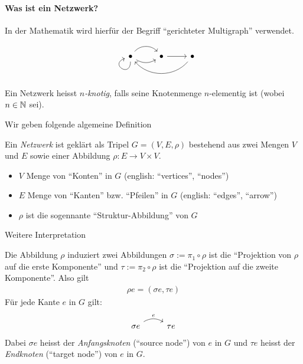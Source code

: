 \paragraph{Was ist ein Netzwerk?}
\begin{remark}
    In der Mathematik wird hierfür der Begriff ``gerichteter Multigraph'' verwendet.
\end{remark}
\begin{example}
    $$
    \begin{tikzcd}
        \bullet \arrow[loop, distance=2em, in=200, out=270] \arrow[r, bend left=49] \arrow[r, bend right] & \bullet \arrow[r] & \bullet \arrow[ll, bend left=49]
    \end{tikzcd}
    $$
\end{example}
\begin{remark}
    Ein Netzwerk heisst \emph{$n$-knotig}, falls seine Knotenmenge $n$-elementig ist (wobei $n \in \mathbb{N}$ sei).
\end{remark}
Wir geben folgende algemeine Definition
\begin{definition}
    Ein \emph{Netzwerk} ist geklärt als Tripel $G = (V,E,\rho)$ bestehend aus zwei Mengen $V$ und $E$ sowie einer Abbildung $\rho\colon E \to V\times V$.
\end{definition}
\begin{interpret}
    \begin{itemize}
        \item $V$ Menge von ``Konten'' in $G$ (english: ``vertices'', ``nodes'')
        \item $E$ Menge von ``Kanten'' bzw. ``Pfeilen'' in $G$ (english: ``edges'', ``arrow'')
        \item $\rho$ ist die sogennante ``Struktur-Abbildung'' von $G$
    \end{itemize}
\end{interpret}
Weitere Interpretation
\begin{interpret}
    Die Abbildung $\rho$ induziert zwei Abbildungen $\sigma := \pi_1 \circ \rho$ ist die ``Projektion von $\rho$ auf die erste Komponente'' und $\tau := \pi_2 \circ \rho$ ist die ``Projektion auf die zweite Komponente''. Also gilt
    \begin{align*}
        \rho e = (\sigma e, \tau e)
    \end{align*}
    Für jede Kante $e$ in $G$ gilt:
    $$
    \begin{tikzcd}
        \sigma e \arrow[r, "e", bend left] & \tau e
    \end{tikzcd}
    $$
    Dabei $\sigma e$ heisst der \emph{Anfangsknoten} (``source node'') von $e$ in $G$ und $\tau e$ heisst der \emph{Endknoten} (``target node'') von $e$ in $G$.
\end{interpret}
